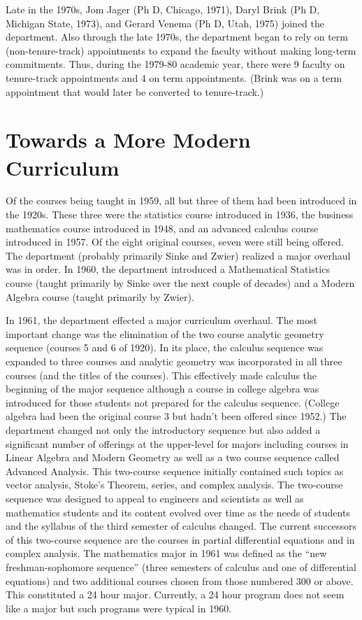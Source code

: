 \documentclass[
]{book}
\begin{document}
Late in the 1970s, Jom Jager (Ph D, Chicago, 1971), Daryl Brink (Ph D, Michigan State, 1973), and Gerard Venema (Ph D, Utah, 1975) joined the department. Also through the late 1970s, the department began to rely on term (non-tenure-track) appointments to expand the faculty without making long-term commitments. Thus, during the 1979-80 academic year, there were 9 faculty on tenure-track appointments and 4 on term appointments. (Brink was on a term appointment that would later be converted to tenure-track.)

\hypertarget{towards-a-more-modern-curriculum}{%
\section{Towards a More Modern Curriculum}\label{towards-a-more-modern-curriculum}}

Of the courses being taught in 1959, all but three of them had been introduced in the 1920s. These three were the statistics course introduced in 1936, the business mathematics course introduced in 1948, and an advanced calculus course introduced in 1957. Of the eight original courses, seven were still being offered. The department (probably primarily Sinke and Zwier) realized a major overhaul was in order. In 1960, the department introduced a Mathematical Statistics course (taught primarily by Sinke over the next couple of decades) and a Modern Algebra course (taught primarily by Zwier).

In 1961, the department effected a major curriculum overhaul. The most important change was the elimination of the two course analytic geometry sequence (courses 5 and 6 of 1920). In its place, the calculus sequence was expanded to three courses and analytic geometry was incorporated in all three courses (and the titles of the courses). This effectively made calculus the beginning of the major sequence although a course in college algebra was introduced for those students not prepared for the calculus sequence. (College algebra had been the original course 3 but hadn't been offered since 1952.) The department changed not only the introductory sequence but also added a significant number of offerings at the upper-level for majors including courses in Linear Algebra and Modern Geometry as well as a two course sequence called Advanced Analysis. This two-course sequence initially contained such topics as vector analysis, Stoke's Theorem, series, and complex analysis. The two-course sequence was designed to appeal to engineers and scientists as well as mathematics students and its content evolved over time as the needs of students and the syllabus of the third semester of calculus changed. The current successors of this two-course sequence are the courses in partial differential equations and in complex analysis. The mathematics major in 1961 was defined as the ``new freshman-sophomore sequence'' (three semesters of calculus and one of differential equations) and two additional courses chosen from those numbered 300 or above. This constituted a 24 hour major. Currently, a 24 hour program does not seem like a major but such programs were typical in 1960.
\end{document}
